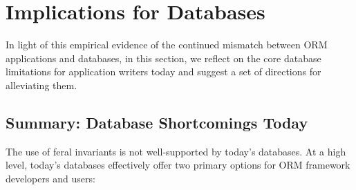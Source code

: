 

\section{Implications for Databases}
\label{sec:feral-discussion}
\label{sec:rails-discussion}

In light of this empirical evidence of the continued mismatch between
ORM applications and databases, in this section, we reflect on the
core database limitations for application writers today and suggest a
set of directions for alleviating them.

\subsection{Summary: Database Shortcomings Today}

The use of feral invariants is not well-supported by today's
databases. At a high level, today's databases effectively offer two
primary options for ORM framework developers and users:

